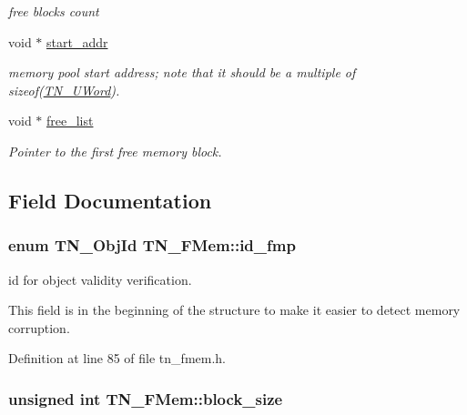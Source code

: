 \begin{DoxyCompactItemize}
\begin{DoxyCompactList}\small\item\em free blocks count \end{DoxyCompactList}\item 
void $\ast$ \hyperlink{structTN__FMem_a7eac768da37c99efd90ae56ebde527cf}{start\+\_\+addr}
\begin{DoxyCompactList}\small\item\em memory pool start address; note that it should be a multiple of {\ttfamily sizeof(\hyperlink{tn__arch__example_8h_ab80cba0fe9ffcd9011d53dfeb9e39bf4}{T\+N\+\_\+\+U\+Word})}. \end{DoxyCompactList}\item 
void $\ast$ \hyperlink{structTN__FMem_a00ffa3c416a57946d95ab8814168eedb}{free\+\_\+list}
\begin{DoxyCompactList}\small\item\em Pointer to the first free memory block. \end{DoxyCompactList}\end{DoxyCompactItemize}


\subsection{Field Documentation}
\hypertarget{structTN__FMem_aee1235a605f90d80ec16547ea647eaff}{
\subsubsection[{id\+\_\+fmp}]{\setlength{\rightskip}{0pt plus 5cm}enum {\bf T\+N\+\_\+\+Obj\+Id} T\+N\+\_\+\+F\+Mem\+::id\+\_\+fmp}}\label{structTN__FMem_aee1235a605f90d80ec16547ea647eaff}


id for object validity verification. 

This field is in the beginning of the structure to make it easier to detect memory corruption. 

Definition at line 85 of file tn\+\_\+fmem.\+h.

\hypertarget{structTN__FMem_a101e3e0eeb2774309a55ed1d6cad8e3f}{
\subsubsection[{block\+\_\+size}]{\setlength{\rightskip}{0pt plus 5cm}unsigned int T\+N\+\_\+\+F\+Mem\+::block\+\_\+size}}\label{structTN__FMem_a101e3e0eeb2774309a55ed1d6cad8e3f}


